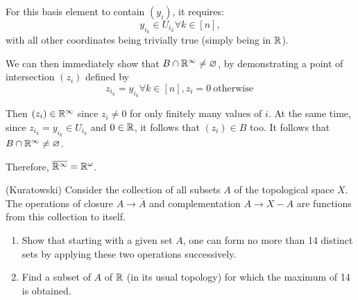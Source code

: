 \documentclass[a4paper, 12pt]{article}
\begin{document}
\begin{solution}
    For this basis element to contain $(y_i)$, it requires:
    \begin{equation*}
    y_{i_k} \in U_{i_k} \forall k \in [n],
    \end{equation*}
    with all other coordinates being trivially true (simply being in $\mathbb{R}$).

    We can then immediately show that $B \cap \mathbb{R}^\infty \neq \varnothing$, by demonstrating a point of intersection $(z_i)$ defined by \begin{equation*}
    z_{i_k} = y_{i_k} \forall k \in [n], z_i = 0 \:\text{otherwise}\: 
    \end{equation*}

    Then $(z_i) \in \mathbb{R}^\infty$ since $z_i \neq 0$ for only finitely many values of $i$. At the same time, since $z_{i_k} = y_{i_k} \in U_{i_k}$ and $0 \in \mathbb{R}$, it follows that $(z_i) \in B$ too. It follows that $B \cap \mathbb{R}^\infty \neq \varnothing$.

    Therefore, $\overline{\mathbb{R}^\infty} = \mathbb{R}^{\omega}$.
\end{solution}

\begin{problem} [17.21* (Bonus)]
(Kuratowski) Consider the collection of all subsets $A$ of the topological space $X$. The operations of closure $A \to \overline{A}$ and complementation $A \to X - A$ are functions from this collection to itself.
\begin{enumerate}
\item Show that starting with a given set $A$, one can form no more than 14 distinct sets by applying these two operations successively.
\item Find a subset of $A$ of $\mathbb{R}$ (in its usual topology) for which the maximum of 14 is obtained.
\end{enumerate}
\end{problem}
\begin{solution}
\end{solution}
\end{document}
